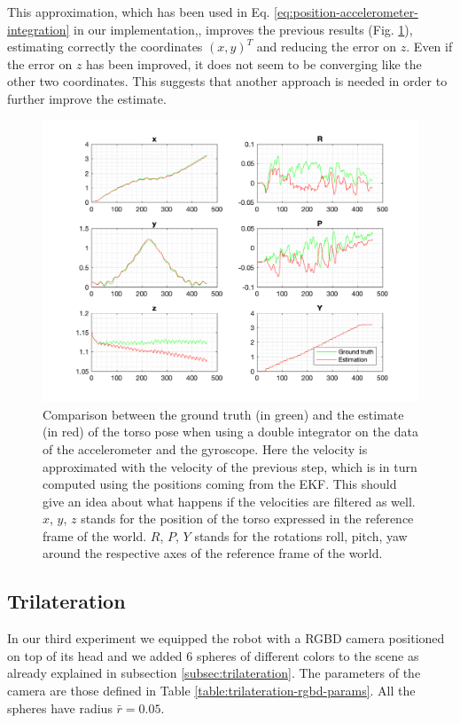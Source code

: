 \documentclass[a4paper]{article}
\begin{document}
This approximation, which has been used in Eq.
\ref{eq:position-accelerometer-integration} in our implementation,,
improves the previous results
(Fig. \ref{fig:comp_ground_truth_estimated_torso_accelerometer_prevlinearvelocity}),
estimating correctly the coordinates $(x, y)^T$
and reducing the error on $z$. Even if the error on $z$ has been improved, it
does not seem to be converging like the other two coordinates.
This suggests that another approach is needed
in order to further improve the estimate.
\begin{figure}
    \centering
    \includegraphics[width=\textwidth]{images/accelerometer_prev_linearvelocity.png}
    \caption{Comparison between the ground truth (in green) and the estimate (in red) of the torso
        pose when using a double integrator on the data of the accelerometer
        and the gyroscope. Here the velocity is approximated with the velocity
        of the previous step, which is in turn computed using the positions
        coming from the EKF. This should give an idea about what happens if the
        velocities are filtered as well. $x$, $y$, $z$ stands for the position
        of the torso expressed in the reference frame of the
        world. $R$, $P$, $Y$ stands for the rotations roll,
        pitch, yaw around the respective axes of the
        reference frame of the world.}
    \label{fig:comp_ground_truth_estimated_torso_accelerometer_prevlinearvelocity}
\end{figure}

\subsection{Trilateration}
In our third experiment we equipped the robot with a RGBD camera positioned
on top of its head and we added 6 spheres of different colors to the scene as
already explained in subsection \ref{subsec:trilateration}. The parameters of
the camera are those defined in Table \ref{table:trilateration-rgbd-params}.
All the spheres
have radius $\bar{r}=0.05$.
\end{document}
